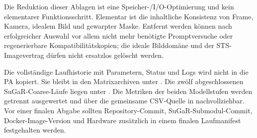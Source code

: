   Die Reduktion dieser Ablagen ist eine Speicher-/I/O-Optimierung und kein
  elementarer Funktionsschritt. Elementar ist die inhaltliche Konsistenz von
  Frame, Kamera, idealem Bild und gewarpter Maske. Entfernt werden können nach
  erfolgreicher Auswahl vor allem nicht mehr benötigte Promptversuche oder
  regenerierbare Kompatibilitätskopien; die ideale Bilddomäne und der
  STS-Imagevertrag dürfen nicht ersatzlos gelöscht werden.

Die vollständige Laufhistorie mit Parametern, Status und Logs wird nicht in die
PA kopiert. Sie bleibt in den Matrixarchiven unter
. Die zwölf abgeschlossenen SuGaR-Coarse-Läufe liegen
unter . Die Metriken der beiden
Modellstufen werden getrennt ausgewertet und über die gemeinsame CSV-Quelle in
 nachvollziehbar. Vor einer finalen Abgabe sollten
Repository-Commit, SuGaR-Submodul-Commit, Docker-Image-Version und Hardware
zusätzlich in einem finalen Laufmanifest festgehalten werden.
